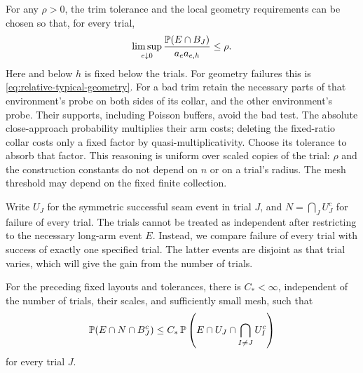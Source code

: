 For any $\rho>0$, the trim tolerance and the local geometry requirements
can be chosen so that, for every trial,
\begin{equation}
 \limsup_{e\downarrow0}
 \frac{\mathbb P(E\cap B_J)}{a_ea_{e,h}}\leq\rho.
 \label{eq:trial-disqualification}
\end{equation}
Here and below $h$ is fixed below the trials.  For geometry failures this
is \eqref{eq:relative-typical-geometry}.  For a bad trim retain the
necessary parts of that environment's probe on both sides of its collar,
and the other environment's probe.  Their supports, including Poisson
buffers, avoid the bad test.  The absolute close-approach probability
multiplies their arm costs; deleting the fixed-ratio collar costs only a
fixed factor by quasi-multiplicativity.  Choose its tolerance to absorb
that factor.  This reasoning is uniform over scaled copies of the trial:
$\rho$ and the construction constants do not depend on $n$ or on a trial's
radius.  The mesh threshold may depend on the fixed finite collection.

Write $U_J$ for the symmetric successful seam event in trial $J$, and
$N=\bigcap_J U_J^c$ for failure of every trial.  The trials cannot be
treated as independent after restricting to the necessary long-arm event
$E$.  Instead, we compare failure of every trial with success of exactly
one specified trial.  The latter events are disjoint as that trial varies,
which will give the gain from the number of trials.

\begin{lemma}
\label{lem:one-trial}
For the preceding fixed layouts and tolerances, there is $C_*<\infty$,
independent of the number of trials, their scales, and sufficiently small
mesh, such that
\begin{equation}
 \mathbb P(E\cap N\cap B_J^c)
 \leq C_*\,
 \mathbb P\left(E\cap U_J\cap\bigcap_{I\ne J}U_I^c\right)
 \label{eq:one-trial-comparison}
\end{equation}
for every trial $J$.
\end{lemma}


